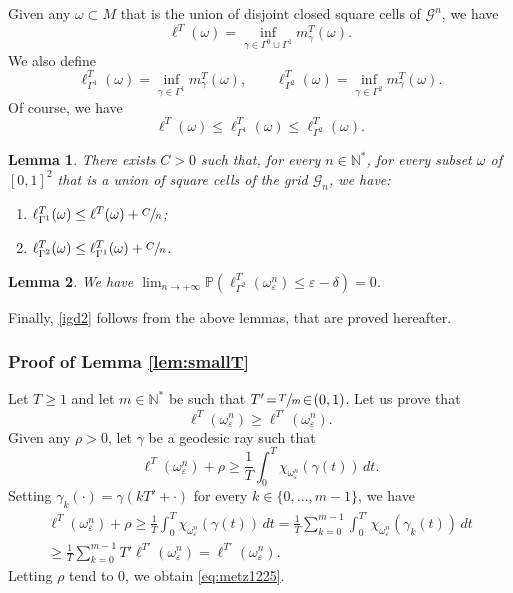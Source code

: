 \documentclass[JEP,XML,SOM,Unicode, NoEqCountersInSection,NoFloatCountersInSection,published]{cedram}
\newenvironment{enumeratea}
{\bgroup\def\theenumi{\alph{enumi}}\begin{enumerate}}
{\end{enumerate}\egroup}
\def\N{\mathbb{N}}
\newtheorem{lemma}{Lemma}
\theoremstyle{definition}
\begin{document}
Given any $\omega\subset M$ that is the union of disjoint closed square cells of $\mathcal{G}^n$, we have
\[
\ell^T(\omega) = \inf_{\gamma\in \Gamma^0 \cup \Gamma^1} m^T_\gamma(\omega).
\]
We also define
\[
\ell_{\Gamma^1}^T(\omega) = \inf_{\gamma\in \Gamma^1} m^T_\gamma(\omega),\qquad
\ell_{\Gamma^2}^T(\omega) = \inf_{\gamma\in \Gamma^2} m^T_\gamma(\omega).
\]
Of course, we have
\[
\ell^T(\omega) \leq \ell_{\Gamma^1}^T(\omega) \leq \ell_{\Gamma^2}^T(\omega).
\]

\begin{lemma}\label{lem:compare}
There exists $C>0$ such that, for every $n\in\N^*$, for every subset $\omega$ of $[0,1]^2$ that is a union of square cells of the grid $\mathcal{G}_n$, we have:
\begin{enumeratea}
\item\label{lem:compareg2g3}
$\ell_{\Gamma^1}^T(\omega)\leq \ell^T(\omega) +\sfrac{C}{n}$;
\item\label{lem:compareg3g4}
$\ell_{\Gamma^2}^T(\omega)\leq \ell_{\Gamma^1}^T(\omega)+\sfrac{C}{n}$.
\end{enumeratea}
\end{lemma}

\begin{lemma}\label{lem:limprobg4}
We have $\displaystyle \lim_{n\to +\infty}\mathbb{P}\left(\ell_{\Gamma^2}^T(\omega_\varepsilon^n)\leq \varepsilon-\delta\right)=0$.
\end{lemma}

Finally, \eqref{igd2} follows from the above lemmas, that are proved hereafter.

\subsubsection{Proof of Lemma \ref{lem:smallT}}
Let $T\!\geq\!1$ and let $m\!\in\!\N^*$ be such that \hbox{$T'\!=\!\sfrac{T}{m}\!\in\!(0,1)$}.
Let us prove that
\begin{equation}\label{eq:metz1225}
\ell^T(\omega_\varepsilon^n) \geq \ell^{T'}(\omega_\varepsilon^n).
\end{equation}
Given any $\rho>0$, let $\gamma$ be a geodesic ray such that
\[
\ell^T(\omega_\varepsilon^n) + \rho \geq \frac{1}{T} \int_0^{T} \chi_{\omega_\varepsilon^n} (\gamma(t) ) \, dt.
\]
Setting $\gamma_k(\cdot)=\gamma(k T'+ \cdot)$ for every $k \in \{ 0, \ldots, m-1\}$, we have
\begin{multline*}
\ell^T(\omega_\varepsilon^n) + \rho \geq \frac{1}{T} \int_0^{T} \chi_{\omega_\varepsilon^n} (\gamma(t) ) \, dt = \frac{1}{T} \sum_{k=0}^{m-1} \int_0^{T'} \chi_{\omega_\varepsilon^n} (\gamma_k(t) ) \, dt\\[-5pt]
\geq \frac{1}{T} \sum_{k=0}^{m-1} T' \ell^{T'}(\omega_\varepsilon^n) = \ell^{T'}(\omega_\varepsilon^n).
\end{multline*}
Letting $\rho$ tend to 0, we obtain \eqref{eq:metz1225}.
\end{document}
